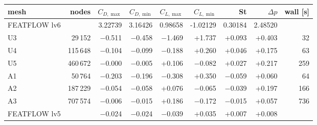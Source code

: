 \begin{tabular}{lrrrrrrrr}
\toprule
mesh & nodes & $C_{D,\max}$ & $C_{D,\min}$ & $C_{L,\max}$ & $C_{L,\min}$ & St & $\Delta p$ & wall [s] \\
\midrule
FEATFLOW lv6 & & 3.22739 & 3.16426 & 0.98658 & -1.02129 & 0.30184 & 2.48520 & \\
\midrule
U3 & 29\,152 & $-$0.511 & $-$0.458 & $-$1.469 & +1.737 & +0.093 & +0.403 & 32 \\
U4 & 115\,648 & $-$0.104 & $-$0.099 & $-$0.188 & +0.260 & +0.046 & +0.175 & 63 \\
U5 & 460\,672 & $-$0.000 & $-$0.005 & +0.106 & $-$0.082 & +0.027 & +0.217 & 259 \\
A1 & 50\,764 & $-$0.203 & $-$0.196 & $-$0.308 & +0.350 & $-$0.059 & +0.060 & 64 \\
A2 & 187\,229 & $-$0.054 & $-$0.058 & +0.076 & $-$0.065 & $-$0.039 & +0.197 & 166 \\
A3 & 707\,574 & $-$0.006 & $-$0.015 & +0.186 & $-$0.172 & $-$0.015 & +0.057 & 736 \\
\midrule
FEATFLOW lv5 & & $-$0.024 & $-$0.024 & $-$0.039 & +0.035 & +0.007 & +0.008 & \\
\bottomrule
\end{tabular}
